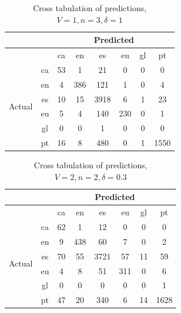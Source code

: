 \documentclass[runningheads]{llncs}
\begin{document}
\begin{table}
	\centering
	\caption{Cross tabulation of predictions, $V=1, n=3, \delta=1$}
	\begin{tabular}{|c|c|c|c|c|c|c|c|} \hline
		& & \multicolumn{6}{c|}{Predicted} \\ \hline
		& &  ca &   en &    es &   eu &  gl &    pt \\ \hline
		\multirow{6}{*}{Actual} & ca   &  53 &    1 &    21 &    0 &   0 &     0 \\
		& en   &   4 &  386 &   121 &    1 &   0 &     4 \\
		& es   &  10 &   15 &  3918 &    6 &   1 &    23 \\
		& eu   &   5 &    4 &   140 &  230 &   0 &     1 \\
		& gl   &   0 &    0 &     1 &    0 &   0 &     0 \\
		& pt   &  16 &    8 &   480 &    0 &   1 &  1550 \\ \hline
	\end{tabular}
\end{table}


\begin{table}
	\centering
	\caption{Cross tabulation of predictions, $V=2, n=2, \delta=0.3$}
	\begin{tabular}{|c|c|c|c|c|c|c|c|} \hline
		& & \multicolumn{6}{c|}{Predicted} \\ \hline
		& &  ca &   en &    es &   eu &  gl &    pt \\ \hline
		\multirow{6}{*}{Actual} & ca   &  62 &    1 &    12 &    0 &   0 &     0 \\
		& en   &   9 &  438 &    60 &    7 &   0 &     2 \\
		& es   &  70 &   55 &  3721 &   57 &  11 &    59 \\
		& eu   &   4 &    8 &    51 &  311 &   0 &     6 \\
		& gl   &   0 &    0 &     0 &    0 &   0 &     1 \\
		& pt   &  47 &   20 &   340 &    6 &  14 &  1628 \\ \hline
	\end{tabular}
\end{table}
\end{document}
